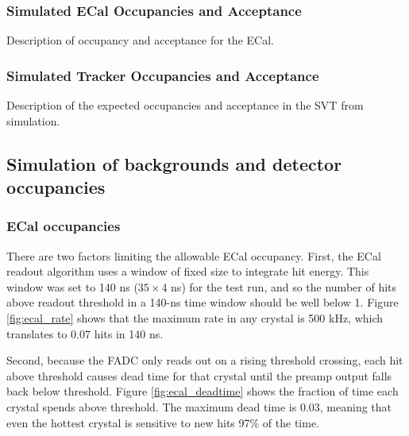 
\subsubsection{Simulated ECal Occupancies and Acceptance}
Description of occupancy and acceptance for the ECal.

\subsubsection{Simulated Tracker Occupancies and Acceptance}
Description of the expected occupancies and acceptance in the SVT from simulation.

\subsection{Simulation of backgrounds and detector occupancies}
\label{sec:backgrounds}

\subsubsection{ECal occupancies}

There are two factors limiting the allowable ECal occupancy. First, the ECal readout algorithm uses a window of fixed size to integrate hit energy. This window was set to 140 ns ($35 \times 4$ ns) for the test run, and so the number of hits above readout threshold in a 140-ns time window should be well below 1. Figure \ref{fig:ecal_rate} shows that the maximum rate in any crystal is 500 kHz, which translates to 0.07 hits in 140 ns.

Second, because the FADC only reads out on a rising threshold crossing, each hit above threshold causes dead time for that crystal until the preamp output falls back below threshold. Figure \ref{fig:ecal_deadtime} shows the fraction of time each crystal spends above threshold. The maximum dead time is 0.03, meaning that even the hottest crystal is sensitive to new hits 97\% of the time.

